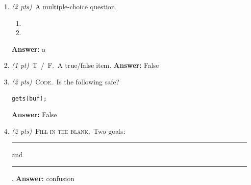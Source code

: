 
\begin{enumerate}
\item \textit{(2 pts)}~A multiple-choice question.
  \begin{enumerate}[label=(\alph*)]
    \item {}
    \item {}
  \end{enumerate}
  \ifanswers \textcolor{keyred}{\textbf{Answer:} a} \fi
\item \textit{(1 pt)}~\textsc{T~/~F.}~A true/false item.
  \ifanswers \textcolor{keyred}{\textbf{Answer:} False} \fi
\item \textit{(2 pts)}~\textsc{Code.}~Is the following safe?
\begin{lstlisting}
gets(buf);
\end{lstlisting}
  \ifanswers \textcolor{keyred}{\textbf{Answer:} False} \fi
\item \textit{(2 pts)}~\textsc{Fill in the blank.}~Two goals: \rule[-2pt]{3cm}{0.4pt} and \rule[-2pt]{3cm}{0.4pt}.
  \ifanswers \textcolor{keyred}{\textbf{Answer:} confusion} \fi
\end{enumerate}


